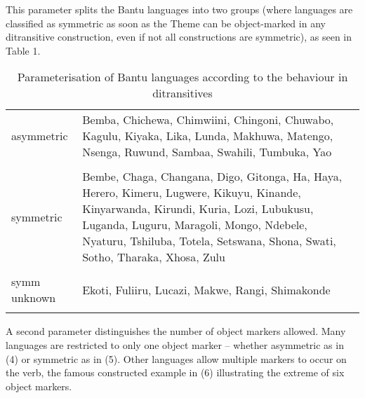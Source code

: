 \documentclass[output=paper
,modfonts
,nonflat]{langsci/langscibook}
\begin{document}
This parameter splits the Bantu languages into two groups (where languages are classified as symmetric as soon as the Theme can be object-marked in any ditransitive construction, even if not all constructions are symmetric), as seen in Table 1.
\begin{table}
\caption{Parameterisation of Bantu languages according to the behaviour in ditransitives}
\label{Table 1}	
	\begin{tabularx}{\textwidth}{lX}
	\lsptoprule
	asymmetric & Bemba, Chichewa, Chimwiini, Chingoni, Chuwabo, Kagulu, Kiyaka,
	Lika, Lunda, Makhuwa, Matengo, Nsenga, Ruwund, Sambaa, Swahili, Tumbuka, Yao\\ \\
	\midrule
	symmetric & Bembe, Chaga, Changana, Digo, Gitonga, Ha, Haya, Herero, Kimeru, Lugwere, Kikuyu, Kinande, Kinyarwanda, Kirundi, Kuria, Lozi, Lubukusu, Luganda, Luguru, Maragoli, Mongo, Ndebele, Nyaturu, Tshiluba, Totela, Setswana, Shona, Swati, Sotho, Tharaka, Xhosa, Zulu\\ \\
	\midrule
	symm unknown & Ekoti, Fuliiru, Lucazi, Makwe, Rangi, Shimakonde\\
	\lspbottomrule
	\end{tabularx}
\end{table} \newpage \noindent
A second parameter distinguishes the number of object markers allowed. Many languages are restricted to only one object marker – whether asymmetric as in (4) or symmetric as in (5). Other languages allow multiple markers to occur on the verb, the famous constructed example in (6) illustrating the extreme of six object markers.
\end{document}

